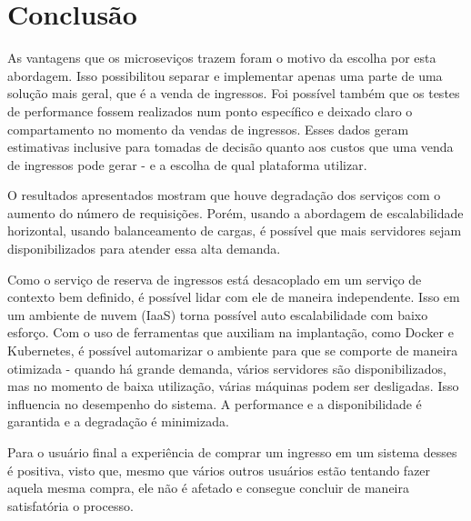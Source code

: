 \chapter*[Conclusão]{Conclusão}

As vantagens que os microseviços trazem foram o motivo da escolha por esta abordagem.
Isso possibilitou separar e implementar apenas uma parte
de uma solução mais geral, que é a venda de ingressos.
Foi possível também que os testes de performance fossem realizados num ponto específico
e deixado claro o compartamento no momento da vendas de ingressos.
Esses dados geram estimativas inclusive para tomadas de decisão quanto aos custos
que uma venda de ingressos pode gerar - e a escolha de qual plataforma utilizar.

O resultados apresentados mostram que houve degradação dos serviços com o aumento do
número de requisições.
Porém, usando a abordagem de escalabilidade horizontal, usando balanceamento de cargas,
é possível que mais servidores sejam disponibilizados para atender essa alta demanda.

Como o serviço de reserva de ingressos está desacoplado em um serviço de contexto bem
definido, é possível lidar com ele de maneira independente.
Isso em um ambiente de nuvem (IaaS) torna possível auto escalabilidade com baixo esforço.
Com o uso de ferramentas que auxiliam na implantação, como Docker e Kubernetes,
é possível automarizar o ambiente para que se comporte de maneira otimizada -
quando há grande demanda, vários servidores são disponibilizados, mas no momento
de baixa utilização, várias máquinas podem ser desligadas.
Isso influencia no desempenho do sistema.
A performance e a disponibilidade é garantida e a degradação é minimizada.

Para o usuário final a experiência de comprar um ingresso em um sistema desses
é positiva, visto que, mesmo que vários outros usuários estão tentando
fazer aquela mesma compra, ele não é afetado e consegue concluir de maneira
satisfatória o processo.
